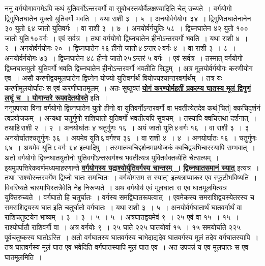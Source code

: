 \documentclass[11pt, openany]{book}
\begin{document}
{{\vspace{-4mm}
 ननु वर्गयोगावगमेऽपि कथं युतिवर्गोऽन्तरवर्गो वा
सुबोधस्तयोर्वैलक्षण्यादिति चेत् उच्यते~। वर्गयोगो द्विगुणितघातेन युक्तो युतिवर्गो भवति~। यथा राशी ३~। ५~। अनयोर्वर्गयोगः ३४~। द्विगुणितघातेनानेन ३० युतो ६४ जातो युतिवर्गः~। वा
राशी ३~। ७~। अनयोर्वर्गयुतिः ५८~। द्विघ्नघातेन ४२ युतो १०० जातो 
युति\textendash \,१०\textendash \,वर्गः~। एवं सर्वत्र~। तथा वर्गयोगो द्विघ्नघातेन हीनोऽन्तरवर्गो
भवति~। यथा राशी ४~। २~। अनयोर्वर्गयोगः २०~। द्विघ्नघातेन १६ हीनो जातो\textendash \,४\textendash \,ऽन्तर\textendash \,२\textendash \,वर्गः ४~। वा राशी ३~। ८~। अनयोर्वर्गयोगः ७३~। द्विघ्नघातेन ४८ हीनो जातो\textendash \,२५\textendash \,ऽन्तरं ५ वर्गः~। एवं सर्वत्र~। तस्मात् वर्गयोगो 
द्विघ्नघातयुतो युतिवर्गो भवति द्विघ्नघातेन हीनोऽन्तरवर्गो भवतीति सिद्धम्~। अत्र मूलयोर्वर्गयोगः करणीयोग एव~। असौ करणीद्वयमूलघातेन द्विघ्नेन
योज्यो युतिवर्गार्थं वियोज्यश्चान्तरवर्गार्थम्~। तत्र यः करणीमूलयोर्घातः स एवं
करणीघातमूलम्~। अतः सुष्ठूक्तं \hyperref[34]{\textbf{योगं करण्योर्महतीं प्रकल्प्य घातस्य मूलं द्विगुणं लघुं च~। योगान्तरे रूपवदेतयोस्ते}} इति~।\\

\vspace{-4mm}
 ननूपपत्त्या विना वर्गयोगो द्विघ्नघातेन युतो हीनो वा
युतिवर्गोऽन्तरवर्गो वा 
भवतीत्येतदेव कथं[चितं] क्कचिदृर्शनं त्वप्रयोजकम्~। अन्यथा
चतुर्गुणो राशिघातो युतिवर्गो भवतीत्यपि सुवचम्~। तस्यापि क्वचित्तथा दर्शनात्~।
तथाहि\textendash \,राशी २~। २~। अनयोर्घातः ४ चतुर्गुणः १६~। अयं जातो युति\textendash \,४\textendash \,वर्गः १६~। 
वा राशी ३~। ३ अनयोर्घातश्चतुर्गुणः ३६~। अयमेव युति\textendash \,६\textendash \,वर्गश्च ३६~। 
वा राशी ४~। ४~। अनयोर्घातः १६~। चतुर्गुणः ६४~। अयमेव युति\textendash \,८\textendash \,वर्गः
६४ इत्यादिषु~। तस्मात्क्वचिद्दर्शनमप्रयोजकं क्वचिद्व्यभिचारस्यापि सम्भवात्~। अतो वर्गयोगो द्विघ्नघातयुतोनो युतिवर्गोऽन्तरवर्गश्च भवतीत्यत्र
युक्तिर्वक्तव्येति चेत्सत्यम्~। इयमुपपत्तिरेकवर्णमध्यमाहरणान्ते
\hyperref[131]{\textbf{वर्गयोगस्य यद्राश्योर्युतिवर्गस्य चान्तरम्~।}}
\newpage
\noindent \hyperref[131]{\textbf{द्विघ्नघातसमानं स्यात्}} इत्यत्र~। तथा {\qt 'राश्योरन्तरवर्गेण द्विघ्नो घातः समन्वितः~। वर्गयोगसम स स्यात्'} इत्यत्राप्याकर एव स्फुटीभविष्यति~। विवरिष्यते
चास्माभिस्तत्रैवेति नेह निरूप्यते~। अथ वर्गयोर्य एवं मूलघातः स एव
घातमूलमित्यत्र युक्तिरुच्यते~। वर्गघातो हि चतुर्घातः~। वर्गस्य
समद्विघातरूपत्वात्~। 
एवमेकस्य समराशिद्वयस्येतरस्य च समराशिद्वयस्य घात इति चतुर्घातो वर्गघातः~। यथा राशी ३~। ५~। अनयोर्वर्गघातार्थं घातवर्गार्थं वा राशिचतुष्टयेन
भाव्यम्~। ३~। ३~। ५~। ५~। अत्रघातद्वयमेवं ९~। २५ एवं वा १५~। १५~। राश्योर्घातौ
राशिवर्गौ वा~। अत्र वर्गयोः ९~। २५ घाते २२५ घातयोर्वा १५~। १५ 
समयोर्घाते २२५ पूर्वचतुष्कस्य घातोऽस्ति~। अतो वर्गघातस्य घातवर्गस्य
चाभेदाद्यदेव घातवर्गस्य मूलं तदेव वर्गघातस्यापि~। तत्र घातवर्गस्य मूलं घात एव
भवेदिति वर्गघातस्यापि मूलं घात एव~। अत उपपन्नं य एव मूलघातः स एव 
घातमूलमिति~।\\

}}
\end{document}
